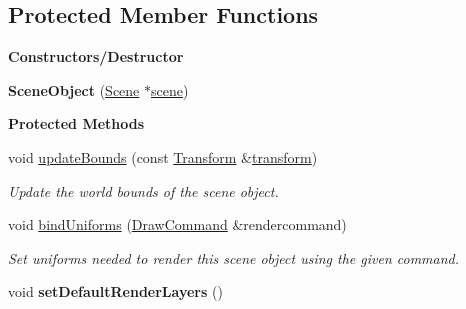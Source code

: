 \subsection*{Protected Member Functions}
\begin{Indent}\textbf{ Constructors/\+Destructor}\par
\begin{DoxyCompactItemize}
\item 
\mbox{\label{classrev_1_1_scene_object_a391ec39b4d5a5deea58e9d5ba08b55c2}} 
{\bfseries Scene\+Object} (\mbox{\hyperlink{classrev_1_1_scene}{Scene}} $\ast$\mbox{\hyperlink{classrev_1_1_scene_object_a099329842e285a99dbe08fd9b1d78004}{scene}})
\end{DoxyCompactItemize}
\end{Indent}
\begin{Indent}\textbf{ Protected Methods}\par
\begin{DoxyCompactItemize}
\item 
\mbox{\label{classrev_1_1_scene_object_a52213bbefa45eebe812fd2d9eeff6a94}} 
void \mbox{\hyperlink{classrev_1_1_scene_object_a52213bbefa45eebe812fd2d9eeff6a94}{update\+Bounds}} (const \mbox{\hyperlink{classrev_1_1_transform}{Transform}} \&\mbox{\hyperlink{classrev_1_1_scene_object_ac19a3863ee83a5bf3320ea7fa2dfc54c}{transform}})
\begin{DoxyCompactList}\small\item\em Update the world bounds of the scene object. \end{DoxyCompactList}\item 
\mbox{\label{classrev_1_1_scene_object_ac29fc422204d6931dcce7960739d7be4}} 
void \mbox{\hyperlink{classrev_1_1_scene_object_ac29fc422204d6931dcce7960739d7be4}{bind\+Uniforms}} (\mbox{\hyperlink{classrev_1_1_draw_command}{Draw\+Command}} \&rendercommand)
\begin{DoxyCompactList}\small\item\em Set uniforms needed to render this scene object using the given command. \end{DoxyCompactList}\item 
\mbox{\label{classrev_1_1_scene_object_a5d87328618aa03664cff98fc9b251ae1}} 
void {\bfseries set\+Default\+Render\+Layers} ()
\end{DoxyCompactItemize}
\end{Indent}

